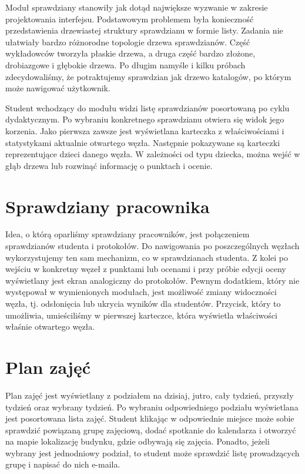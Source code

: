 \documentclass{pracamgr}
\begin{document}
Moduł sprawdziany stanowiły jak dotąd największe wyzwanie w zakresie projektowania
interfejsu. Podstawowym problemem była konieczność przedstawienia drzewiastej
struktury sprawdzianu w formie listy. Zadania nie ułatwiały bardzo różnorodne
topologie drzewa sprawdzianów. Część wykładowców tworzyła płaskie drzewa, a druga
część bardzo złożone, drobiazgowe i głębokie drzewa. Po długim namyśle i kilku próbach
zdecydowaliśmy, że potraktujemy sprawdzian jak drzewo katalogów, po którym może
nawigować użytkownik.

Student wchodzący do modułu widzi listę sprawdzianów posortowaną po cyklu dydaktycznym.
Po wybraniu konkretnego sprawdzianu otwiera się widok jego korzenia. Jako pierwsza
zawsze jest wyświetlana karteczka z właściwościami i statystykami aktualnie otwartego
węzła. Następnie pokazywane są karteczki reprezentujące dzieci danego węzła.
W zależności od typu dziecka, można wejść w głąb drzewa lub rozwinąć informację
o punktach i ocenie.

\section{Sprawdziany pracownika}

Idea, o którą oparliśmy sprawdziany pracowników, jest połączeniem sprawdzianów
studenta i protokołów. Do nawigowania po poszczególnych węzłach wykorzystujemy
ten sam mechanizm, co w sprawdzianach studenta. Z kolei po wejściu w konkretny
węzeł z punktami lub ocenami i przy próbie edycji oceny wyświetlany jest ekran
analogiczny do protokołów. Pewnym dodatkiem, który nie występował w wymienionych
modułach, jest możliwość zmiany widoczności węzła, tj. odsłonięcia lub ukrycia
wyników dla studentów. Przycisk, który to umożliwia, umieściliśmy w pierwszej
karteczce, która wyświetla właściwości właśnie otwartego węzła.

\section{Plan zajęć}

Plan zajęć jest wyświetlany z podziałem na dzisiaj, jutro, cały tydzień, przyszły
tydzień oraz wybrany tydzień. Po wybraniu odpowiedniego podziału wyświetlana jest
posortowana lista zajęć. Student klikając w odpowiednie miejsce może sobie sprawdzić
powiązaną grupę zajęciową, dodać spotkanie do kalendarza i otworzyć na mapie
lokalizację budynku, gdzie odbywają się zajęcia. Ponadto, jeżeli wybrany jest
jednodniowy podział, to student może sprawdzić listę prowadzących grupę i napisać
do nich e-maila.
\end{document}
